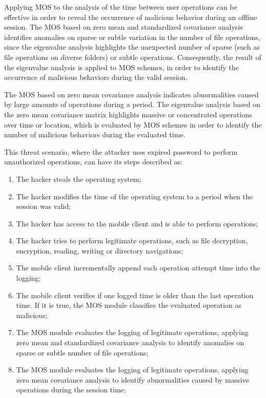 \documentclass[twocolumn]{svjour3}          	%
\begin{document}
Applying MOS to the analysis of the time between user operations can be effective in order to reveal the occurrence of malicious behavior during an offline session. The MOS based on zero mean and standardized covariance analysis identifies anomalies on sparse or subtle variation in the number of file operations, since the eigenvalue analysis highlights the unexpected number of sparse (such as file operations on diverse folders) or subtle operations. Consequently, the result of the eigenvalue analysis is applied to MOS schemes, in order to identify the occurrence of malicious behaviors during the valid session.

The MOS based on zero mean covariance analysis indicates abnormalities caused by large amounts of operations during a period. The eigenvalue analysis based on the zero mean covariance matrix highlights massive or concentrated operations over time or location, which is evaluated by MOS schemes in order to identify the number of malicious behaviors during the evaluated time.

This threat scenario, where the attacker uses expired password to perform unauthorized operations, can have its steps described as:

\begin{enumerate}[label=(\alph*)]
	\item The hacker steals the operating system;
	\item The hacker modifies the time of the operating system to a period when the session was valid;
	\item The hacker has access to the mobile client and is able to perform operations;
	\item The hacker tries to perform legitimate operations, such as file decryption, encryption, reading, writing or directory navigations;
	\item The mobile client incrementally append each operation attempt time into the logging;
	\item The mobile client verifies if one logged time is older than the last operation time. If it is true, the MOS module classifies the evaluated operation as malicious;
	\item The MOS module evaluates the logging of legitimate operations, applying zero mean and standardized covariance analysis to identify anomalies on sparse or subtle number of file operations;
	\item The MOS module evaluates the logging of legitimate operations, applying zero mean covariance analysis to identify abnormalities caused by massive operations during the session time;
\end{enumerate}
\end{document}
